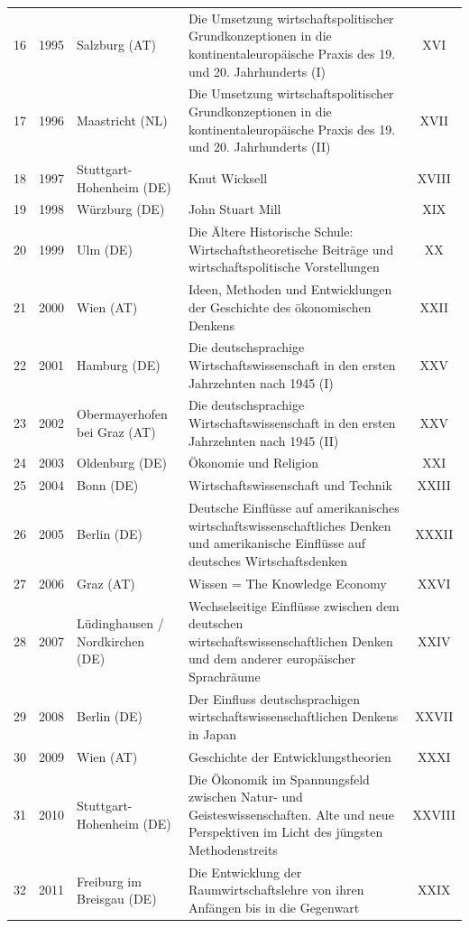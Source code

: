 \documentclass[11pt,a4paper,twoside]{article}
\begin{document}
\begin{longtable}{@{}r c L{3.0cm} L{6.7cm} c@{}}
16 & 1995 & Salzburg (AT) & Die Umsetzung wirtschaftspolitischer Grundkonzeptionen in die kontinentaleuropäische Praxis des 19. und 20. Jahrhunderts (I) & XVI\\
17 & 1996 & Maastricht (NL) & Die Umsetzung wirtschaftspolitischer Grundkonzeptionen in die kontinentaleuropäische Praxis des 19. und 20. Jahrhunderts (II) & XVII\\
18 & 1997 & Stuttgart-Hohenheim (DE) & Knut Wicksell & XVIII\\
19 & 1998 & Würzburg (DE) & John Stuart Mill & XIX\\
20 & 1999 & Ulm (DE) & Die Ältere Historische Schule: Wirtschaftstheoretische Beiträge und wirtschaftspolitische Vorstellungen & XX\\
21 & 2000 & Wien (AT) & Ideen, Methoden und Entwicklungen der Geschichte des ökonomischen Denkens & XXII\\
22 & 2001 & Hamburg (DE) & Die deutschsprachige Wirtschaftswissenschaft in den ersten Jahrzehnten nach 1945 (I) & XXV\\
23 & 2002 & Obermayerhofen bei Graz (AT) & Die deutschsprachige Wirtschaftswissenschaft in den ersten Jahrzehnten nach 1945 (II) & XXV\\
24 & 2003 & Oldenburg (DE) & Ökonomie und Religion & XXI\\
25 & 2004 & Bonn (DE) & Wirtschaftswissenschaft und Technik & XXIII\\
26 & 2005 & Berlin (DE) & Deutsche Einflüsse auf amerikanisches wirtschaftswissenschaftliches Denken und amerikanische Einflüsse auf deutsches Wirtschaftsdenken & XXXII\\
27 & 2006 & Graz (AT) & Wissen = The Knowledge Economy & XXVI\\
28 & 2007 & Lüdinghausen / Nordkirchen (DE) & Wechselseitige Einflüsse zwischen dem deutschen wirtschaftswissenschaftlichen Denken und dem anderer europäischer Sprachräume & XXIV\\
29 & 2008 & Berlin (DE) & Der Einfluss deutschsprachigen wirtschaftswissenschaftlichen Denkens in Japan & XXVII\\
30 & 2009 & Wien (AT) & Geschichte der Entwicklungstheorien & XXXI\\
31 & 2010 & Stuttgart-Hohenheim (DE) & Die Ökonomik im Spannungsfeld zwischen Natur- und Geisteswissenschaften. Alte und neue Perspektiven im Licht des jüngsten Methodenstreits & XXVIII\\
32 & 2011 & Freiburg im Breisgau (DE) & Die Entwicklung der Raumwirtschaftslehre von ihren Anfängen bis in die Gegenwart & XXIX\\

\end{longtable}
\end{document}
